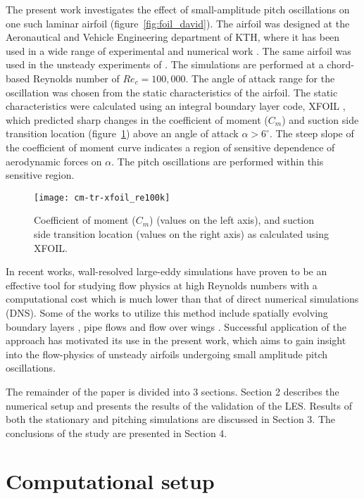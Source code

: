 The present work investigates the effect of small-amplitude pitch oscillations on one such laminar airfoil (figure~\ref{fig:foil_david}). The airfoil was designed at the Aeronautical and Vehicle Engineering department of KTH, where it has been used in a wide range of experimental and numerical work \citep{lokatt17}. The same airfoil was used in the unsteady experiments of \cite{lokattthesis}. The simulations are performed at a chord-based Reynolds number of $Re_{c}=100,000$. The angle of attack range for the oscillation was chosen from the static characteristics of the airfoil. The static characteristics were calculated using an integral boundary layer code, XFOIL \citep{drela89}, which predicted sharp changes in the coefficient of moment ($C_{m}$) and suction side transition location (figure~\ref{fig:xfoil_cm}) above an angle of attack $\alpha>6^{\circ}$. The steep slope of the coefficient of moment curve indicates a region of sensitive dependence of aerodynamic forces on $\alpha$. The pitch oscillations are performed within this sensitive region.
\begin{figure}[h]
	\centering
	\texttt{[image: cm-tr-xfoil\_re100k]}
	\caption{Coefficient of moment ($C_{m}$) (values on the left axis), and suction side transition location (values on the right axis) as calculated using XFOIL.}
	\label{fig:xfoil_cm}
\end{figure}

In recent works, wall-resolved large-eddy simulations have proven to be an effective tool for studying flow physics at high Reynolds numbers with a computational cost which is much lower than that of direct numerical simulations (DNS). Some of the works to utilize this method include spatially evolving boundary layers \citep{eitel14}, pipe flows \citep{chin15} and flow over wings \citep{uzun10,lombard15}. Successful application of the approach has motivated its use in the present work, which aims to gain insight into the flow-physics of unsteady airfoils undergoing small amplitude pitch oscillations.

The remainder of the paper is divided into 3 sections. Section 2 describes the numerical setup and presents the results of the validation of the LES. Results of both the stationary and pitching simulations are discussed in Section 3. The conclusions of the study are presented in Section 4.

\section{Computational setup}

